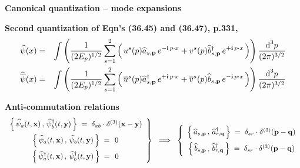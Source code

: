 \begin{frame}{\headingColor\bf\Large Canonical quantization -- mode expansions}

\small

\vskip 0.5cm
\textbf{Second quantization of Eqn's (36.45) and (36.47), p.331, \cite{LancasterBlundell2014}}
\begin{eqnarray*}
\widehat{\psi}(x)
& = &
	\int\left(
		\dfrac{1}{(2E_{p})^{1/2}}\,
		\overset{2}{\underset{s=1}{\sum}}
		\left(\,
			u^{s}(p)\widehat{a}_{s,\mathbf{p}}\,e^{-\textnormal{\bf i}\,p\cdot x}
			+
			v^{s}(p)\widehat{b}^{\dagger}_{s,\mathbf{p}}\,e^{+\textnormal{\bf i}\,p\cdot x}
			\,\right)
		\right)
		\dfrac{\textnormal{d}^{3}p}{(2\pi)^{3/2}}
\\
\widehat{\overline{\psi}}(x)
& = &
	\int\left(
		\dfrac{1}{(2E_{p})^{1/2}}\,
		\overset{2}{\underset{s=1}{\sum}}
		\left(\,
			\overline{u}^{s}(p)\widehat{a}^{\dagger}_{s,\mathbf{p}}\,e^{+\textnormal{\bf i}\,p\cdot x}
			+
			\overline{v}^{s}(p)\widehat{b}_{s,\mathbf{p}}\,e^{-\textnormal{\bf i}\,p\cdot x}
			\,\right)
		\right)
		\dfrac{\textnormal{d}^{3}p}{(2\pi)^{3/2}}
\end{eqnarray*}

\vskip 0.3cm
\textbf{Anti-commutation relations}
\begin{equation*}
\left.
	\begin{array}{c}
	\left\{\,\widehat{\psi}_{a}(t,\mathbf{x})\,,\,\widehat{\psi}^{\dagger}_{b}(t,\mathbf{y})\,\right\}
	\;=\;
		\delta_{ab}\cdot\delta^{(3)}(\mathbf{x}-\mathbf{y}) 
	\\
	\left\{\,\widehat{\psi}_{a}(t,\mathbf{x})\,,\,\widehat{\psi}_{b}(t,\mathbf{y})\,\right\}
	\;=\;
		\overset{{\color{white}\textnormal{\Huge-}}}{0}
	\\
	\left\{\,\widehat{\psi}^{\dagger}_{a}(t,\mathbf{x})\,,\,\widehat{\psi}^{\dagger}_{b}(t,\mathbf{y})\,\right\}
	\;=\;
		\overset{{\color{white}\textnormal{\Huge-}}}{0}
	\end{array}
\right\}
\;\;\Longrightarrow\;\;
\left\{
	\begin{array}{c}
	\left\{\,\widehat{a}_{s,\mathbf{p}}\,,\,\widehat{a}^{\dagger}_{r,\mathbf{q}}\,\right\}
	\;=\;
		\delta_{sr}\cdot\delta^{(3)}(\mathbf{p}-\mathbf{q}) 
	\\
	\left\{\,\widehat{b}_{s,\mathbf{p}}\,,\,\widehat{b}^{\dagger}_{r,\mathbf{q}}\,\right\}
	\;\overset{{\color{white}\textnormal{\Large1}}}{=}\;
		\delta_{sr}\cdot\delta^{(3)}(\mathbf{p}-\mathbf{q}) 
	\end{array}
\right.
\end{equation*}

\end{frame}
\normalsize

